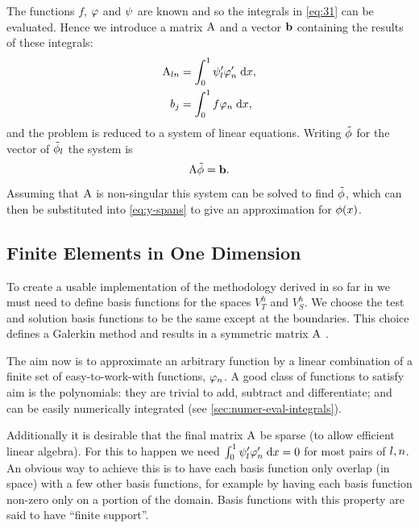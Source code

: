 The functions $f$, $\varphi$ and $\psi$ are known and so the integrals in \cref{eq:31} can be evaluated.
Hence we introduce a matrix $\mathrm{A}$ and a vector ${\boldsymbol{\mathrm{b}}}$ containing the results of these integrals:
\begin{equation}
  \begin{aligned}
    \mathrm{A}_{ln} &= {\int_0^1  \psi_l'\varphi'_{n}  {\; \mathrm{{d}}}{x}}, \\
    b_{j} &= {\int_0^1  f\varphi_{n}  {\; \mathrm{{d}}}{x}}, \\
    \label{eq:Aij_bj}
  \end{aligned}
\end{equation}
and the problem is reduced to a system of linear equations.
Writing $\tilde{\phi}$ for the vector of $\tilde{\phi}_l$ the system is
\begin{equation}
  \mathrm{A} \tilde{\phi} = {\boldsymbol{\mathrm{b}}}.
  \label{eq:final_galerkin}
\end{equation}
Assuming that $\mathrm{A}$ is non-singular this system can be solved to find $\tilde{\phi}$, which can then be substituted into \cref{eq:y-spans} to give an approximation for $\phi(x)$.


\subsection{Finite Elements in One Dimension}
\label{sub:Actual-Finite-Elements}

To create a usable implementation of the methodology derived in so far in  we must need to define basis functions for the spaces $V_{T}^{h}$ and $V_S^h$.
We choose the test and solution basis functions to be the same except at the boundaries.
This choice defines a Galerkin method and results in a symmetric matrix $\mathrm{A}$ \cite[215]{Zeinkiewicz1967}.

The aim now is to approximate an arbitrary function by a linear combination of a finite set of easy-to-work-with functions, $\varphi_n$.
A good class of functions to satisfy aim is the polynomials: they are trivial to add, subtract and differentiate; and can be easily numerically integrated (see \cref{sec:numer-eval-integrals}).

Additionally it is desirable that the final matrix $\mathrm{A}$ be sparse (to allow efficient linear algebra).
For this to happen we need ${\int_0^1  \psi_l'\varphi'_{n}  {\; \mathrm{{d}}}{x}} = 0$ for most pairs of $l, n$.
An obvious way to achieve this is to have each basis function only overlap (in space) with a few other basis functions, for example by having each basis function non-zero only on a portion of the domain.
Basis functions with this property are said to have ``finite support''.

